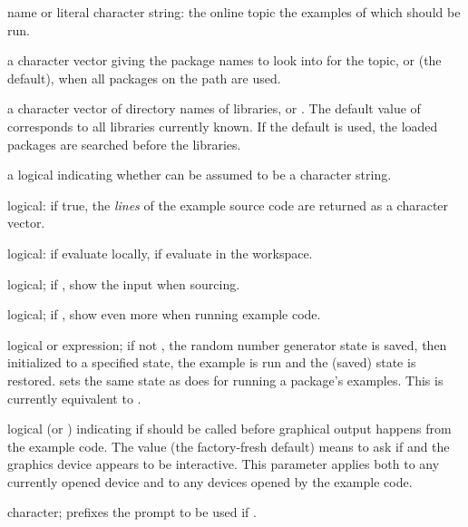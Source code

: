 \begin{Arguments}
\begin{ldescription}
\item[\code{topic}] name or literal character string: the online
 topic the examples of which should be run.
\item[\code{package}] a character vector giving the package names to look
into for the topic, or  (the default), when all packages on
the  path are used.
\item[\code{lib.loc}] a character vector of directory names of \R{} libraries,
or .  The default value of  corresponds to all
libraries currently known.  If the default is used, the loaded
packages are searched before the libraries.
\item[\code{character.only}] a logical indicating whether  can be
assumed to be a character string.
\item[\code{give.lines}] logical: if true, the \emph{lines} of the example
source code are returned as a character vector.
\item[\code{local}] logical: if  evaluate locally, if 
evaluate in the workspace.
\item[\code{echo}] logical;  if , show the \R{} input when sourcing.
\item[\code{verbose}] logical;  if , show even more when running
example code.
\item[\code{setRNG}] logical or expression;  if not , the random
number generator state is saved, then initialized to a specified state,
the example is run and the (saved) state is restored.
 sets the same state as
 does for
running a package's examples.  This is currently equivalent to
.
\item[\code{ask}] logical (or ) indicating if
 should be called
before graphical output happens from the example code.  The value
 (the factory-fresh default) means to ask if
 and the graphics device appears to be
interactive.  This parameter applies both to any currently opened
device and to any devices opened by the example code.
\item[\code{prompt.prefix}] character; prefixes the prompt to be used if
.
\end{ldescription}
\end{Arguments}
